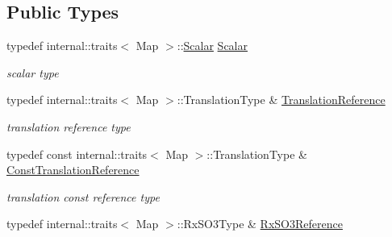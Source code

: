 \subsection*{Public Types}
\begin{DoxyCompactItemize}
\item 
typedef internal\+::traits$<$ Map $>$\+::\hyperlink{class_eigen_1_1_map_3_01_sophus_1_1_sim3_group_3_01___scalar_01_4_00_01___options_01_4_a86a161ee4ef7691f50a6de409dda5a3e}{Scalar} \hyperlink{class_eigen_1_1_map_3_01_sophus_1_1_sim3_group_3_01___scalar_01_4_00_01___options_01_4_a86a161ee4ef7691f50a6de409dda5a3e}{Scalar}\hypertarget{class_eigen_1_1_map_3_01_sophus_1_1_sim3_group_3_01___scalar_01_4_00_01___options_01_4_a86a161ee4ef7691f50a6de409dda5a3e}{}\label{class_eigen_1_1_map_3_01_sophus_1_1_sim3_group_3_01___scalar_01_4_00_01___options_01_4_a86a161ee4ef7691f50a6de409dda5a3e}

\begin{DoxyCompactList}\small\item\em scalar type \end{DoxyCompactList}\item 
typedef internal\+::traits$<$ Map $>$\+::Translation\+Type \& \hyperlink{class_eigen_1_1_map_3_01_sophus_1_1_sim3_group_3_01___scalar_01_4_00_01___options_01_4_ac20dcaba9f5cca24de324bbd62cb6024}{Translation\+Reference}\hypertarget{class_eigen_1_1_map_3_01_sophus_1_1_sim3_group_3_01___scalar_01_4_00_01___options_01_4_ac20dcaba9f5cca24de324bbd62cb6024}{}\label{class_eigen_1_1_map_3_01_sophus_1_1_sim3_group_3_01___scalar_01_4_00_01___options_01_4_ac20dcaba9f5cca24de324bbd62cb6024}

\begin{DoxyCompactList}\small\item\em translation reference type \end{DoxyCompactList}\item 
typedef const internal\+::traits$<$ Map $>$\+::Translation\+Type \& \hyperlink{class_eigen_1_1_map_3_01_sophus_1_1_sim3_group_3_01___scalar_01_4_00_01___options_01_4_a922a4d47116d43b66cc711cbe71b2b29}{Const\+Translation\+Reference}\hypertarget{class_eigen_1_1_map_3_01_sophus_1_1_sim3_group_3_01___scalar_01_4_00_01___options_01_4_a922a4d47116d43b66cc711cbe71b2b29}{}\label{class_eigen_1_1_map_3_01_sophus_1_1_sim3_group_3_01___scalar_01_4_00_01___options_01_4_a922a4d47116d43b66cc711cbe71b2b29}

\begin{DoxyCompactList}\small\item\em translation const reference type \end{DoxyCompactList}\item 
typedef internal\+::traits$<$ Map $>$\+::Rx\+S\+O3\+Type \& \hyperlink{class_eigen_1_1_map_3_01_sophus_1_1_sim3_group_3_01___scalar_01_4_00_01___options_01_4_a1125dae9dde0a4f3394e10bd952808e1}{Rx\+S\+O3\+Reference}\hypertarget{class_eigen_1_1_map_3_01_sophus_1_1_sim3_group_3_01___scalar_01_4_00_01___options_01_4_a1125dae9dde0a4f3394e10bd952808e1}{}\label{class_eigen_1_1_map_3_01_sophus_1_1_sim3_group_3_01___scalar_01_4_00_01___options_01_4_a1125dae9dde0a4f3394e10bd952808e1}


\end{DoxyCompactItemize}

